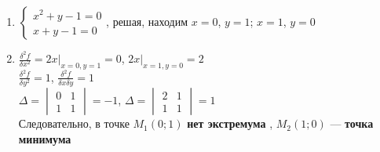 \documentclass{article}
\begin{document}
\begin{enumerate}
    \item $
    \begin{cases}
        x^2 + y - 1 = 0 \\
        x + y - 1 = 0
    \end{cases}
    $, решая, находим $x = 0$, $y = 1$; $x = 1$, $y = 0$
    \item $\frac{\delta^2 f}{\delta x^2} = 2 x \bigg|_{x = 0, y = 1} = 0$, $2x \bigg|_{x = 1, y = 0} = 2$ \\
    $\frac{\delta^2 f}{\delta y^2} = 1$, $\frac{\delta^2 f}{\delta x \delta y} = 1$ \\
    $\Delta = \begin{vmatrix}
        0 & 1 \\
        1 & 1
    \end{vmatrix} = -1$, $\Delta = \begin{vmatrix}
        2 & 1 \\
        1 & 1
    \end{vmatrix} = 1$ \\
    Следовательно, в точке $M_1 (0; 1)$ \textbf{нет экстремума} , $M_2 (1; 0)$ — \textbf{точка минимума}
\end{enumerate}
\end{document}
